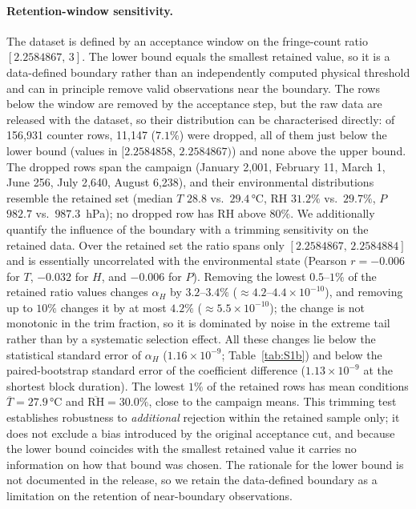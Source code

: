 \documentclass[aps,prapplied,reprint,superscriptaddress]{revtex4-2}
\begin{document}
\paragraph{Retention-window sensitivity.} The dataset is defined by an acceptance window on the fringe-count ratio $[2.2584867,\,3]$. The lower bound equals the smallest retained value, so it is a data-defined boundary rather than an independently computed physical threshold and can in principle remove valid observations near the boundary. The rows below the window are removed by the acceptance step, but the raw data are released with the dataset, so their distribution can be characterised directly: of 156{,}931 counter rows, 11{,}147 ($7.1\%$) were dropped, all of them just below the lower bound (values in $[2.2584858,\,2.2584867)$) and none above the upper bound. The dropped rows span the campaign (January 2{,}001, February 11, March 1, June 256, July 2{,}640, August 6{,}238), and their environmental distributions resemble the retained set (median $T$ $28.8$ vs.\ $29.4\,\si{\celsius}$, RH $31.2\%$ vs.\ $29.7\%$, $P$ $982.7$ vs.\ $987.3$~hPa); no dropped row has RH above $80\%$. We additionally quantify the influence of the boundary with a trimming sensitivity on the retained data. Over the retained set the ratio spans only $[2.2584867,\,2.2584884]$ and is essentially uncorrelated with the environmental state (Pearson $r = -0.006$ for $T$, $-0.032$ for $H$, and $-0.006$ for $P$). Removing the lowest $0.5$--$1\%$ of the retained ratio values changes $\alpha_H$ by $3.2$--$3.4\%$ ($\approx 4.2$--$4.4\times10^{-10}$), and removing up to $10\%$ changes it by at most $4.2\%$ ($\approx 5.5\times10^{-10}$); the change is not monotonic in the trim fraction, so it is dominated by noise in the extreme tail rather than by a systematic selection effect. All these changes lie below the statistical standard error of $\alpha_H$ ($1.16\times10^{-9}$; Table~\ref{tab:S1b}) and below the paired-bootstrap standard error of the coefficient difference ($1.13\times10^{-9}$ at the shortest block duration). The lowest $1\%$ of the retained rows has mean conditions $\overline{T}=27.9\,\si{\celsius}$ and $\overline{\mathrm{RH}}=30.0\%$, close to the campaign means. This trimming test establishes robustness to \emph{additional} rejection within the retained sample only; it does not exclude a bias introduced by the original acceptance cut, and because the lower bound coincides with the smallest retained value it carries no information on how that bound was chosen. The rationale for the lower bound is not documented in the release, so we retain the data-defined boundary as a limitation on the retention of near-boundary observations.
\end{document}

